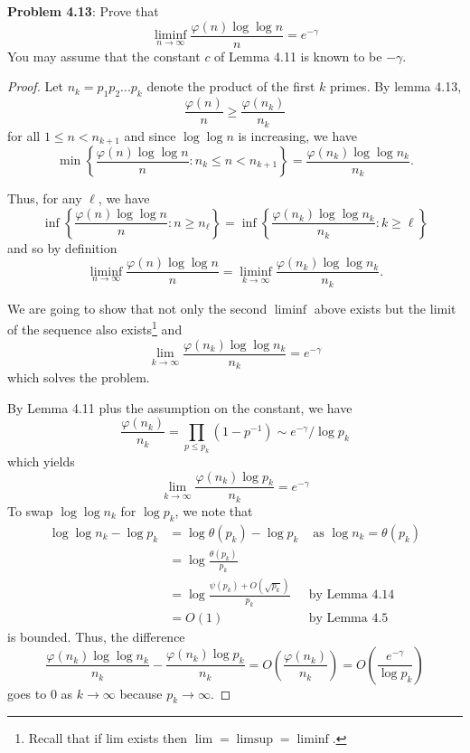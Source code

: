 \documentclass[12pt]{article}
\renewcommand{\O}[1]{O\left( #1 \right)}
\begin{document}
\fi

\textbf{Problem 4.13}: Prove that
$$\liminf_{n \rightarrow \infty} \frac{\varphi(n) \log \log n}{n} = e^{-\gamma}$$
You may assume that the constant $c$ of Lemma 4.11 is known to be $-\gamma$.

\begin{proof}
Let $n_k = p_1 p_2 ... p_k$ denote the product of the first $k$ primes. By lemma 4.13,
$$\frac{\varphi(n)}{n} \geq \frac{\varphi(n_k)}{n_k}$$
for all $1 \leq n < n_{k+1}$ and since $\log \log n$ is increasing, we have
$$\min\left\{ \frac{\varphi(n) \log \log n}{n} : n_k \leq n < n_{k+1} \right\} = \frac{\varphi(n_k) \log\log n_k}{n_k}.$$

Thus, for any $\ell$, we have
$$\inf\left\{ \frac{\varphi(n) \log \log n}{n} : n \geq n_\ell \right\} = \inf\left\{\frac{\varphi(n_k) \log\log n_k}{n_k} : k \geq \ell \right\}$$
and so by definition
$$\liminf_{n \rightarrow \infty} \frac{\varphi(n) \log \log n}{n} = \liminf_{k \rightarrow \infty} \frac{\varphi(n_k) \log\log n_k}{n_k}.$$

We are going to show that not only the second $\liminf$ above exists but the limit of the sequence also exists\footnote{Recall that if lim exists then $\lim = \limsup = \liminf$.} and
$$\lim_{k \rightarrow \infty} \frac{\varphi(n_k) \log\log n_k}{n_k} = e^{-\gamma}$$
which solves the problem.

By Lemma 4.11 plus the assumption on the constant, we have
$$\frac{\varphi(n_k)}{n_k} = \prod_{p \leq p_k} (1 - p^{-1}) \sim e^{-\gamma} / \log p_k$$
which yields
$$\lim_{k \rightarrow \infty} \frac{\varphi(n_k) \log p_k}{n_k} = e^{-\gamma}$$
To swap $\log \log n_k$ for $\log p_k$, we note that
\begin{align*}
\log \log n_k - \log p_k &= \log \theta(p_k) - \log p_k &\text{ as } \log n_k = \theta(p_k)\\
&= \log \frac{\theta(p_k)}{p_k}\\
&= \log \frac{\psi(p_k) + \O{ \sqrt{p_k} } }{p_k} &\text{by Lemma 4.14}\\
&= \O{1} &\text{by Lemma 4.5}
\end{align*}
is bounded. Thus, the difference
$$\frac{\varphi(n_k) \log \log n_k}{n_k} - \frac{\varphi(n_k) \log p_k}{n_k} = \O{ \frac{\varphi(n_k)}{n_k} } = \O{ \frac{e^{-\gamma}}{\log p_k} }$$
goes to 0 as $k \rightarrow \infty$ because $p_k \rightarrow \infty$.
\end{proof}

\unless\ifdefined\IsMainDocument
\end{document}
